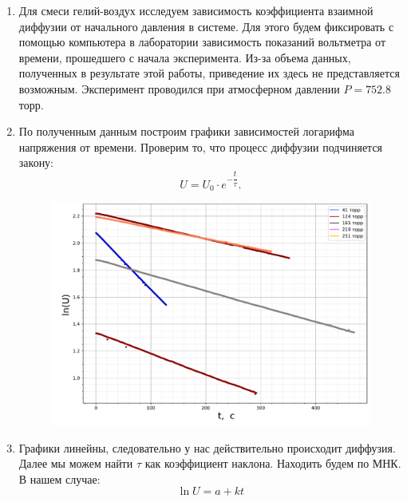 \documentclass[a4paper,12pt]{article}
\theoremstyle{definition}
\begin{document}
\begin{enumerate}
\item Для смеси гелий-воздух исследуем зависимость коэффициента взаимной диффузии от начального давления в системе. Для этого будем фиксировать с помощью компьютера в лаборатории зависимость показаний вольтметра от времени, прошедшего с начала эксперимента. Из-за объема данных, полученных в результате этой работы, приведение их здесь не представляется возможным. Эксперимент проводился при атмосферном давлении $P=752.8$торр.

\item По полученным данным построим графики зависимостей логарифма напряжения от времени. Проверим то, что процесс диффузии подчиняется закону: \[U = U_0 \cdot e^{-\dfrac{t}{\tau}}.\]



\begin{figure}[H]
\centering
\includegraphics*[scale=0.7]{speed.pdf}
\end {figure}

\item Графики линейны, следовательно у нас действительно происходит диффузия. Далее мы можем найти $\tau$ как коэффициент наклона. Находить будем по МНК. В нашем случае: $$\ln{U} =a + k t $$



\end{enumerate}
\end{document}
